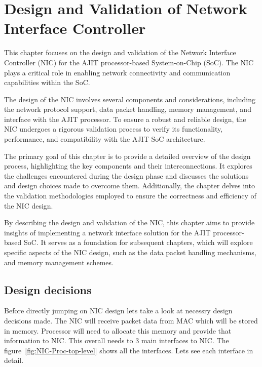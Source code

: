\documentclass[a4paper,11pt, final]{report}
\begin{document}
\chapter{Design and Validation of Network Interface Controller}

This chapter focuses on the design and validation of the Network Interface Controller (NIC) for the AJIT processor-based System-on-Chip (SoC). The NIC plays a critical role in enabling network connectivity and communication capabilities within the SoC.

The design of the NIC involves several components and considerations, including the network protocol support, data packet handling, memory management, and interface with the AJIT processor. To ensure a robust and reliable design, the NIC undergoes a rigorous validation process to verify its functionality, performance, and compatibility with the AJIT SoC architecture.

The primary goal of this chapter is to provide a detailed overview of the design process, highlighting the key components and their interconnections. It explores the challenges encountered during the design phase and discusses the solutions and design choices made to overcome them. Additionally, the chapter delves into the validation methodologies employed to ensure the correctness and efficiency of the NIC design.

By describing the design and validation of the NIC, this chapter aims to provide insights of implementing a network interface solution for the AJIT processor-based SoC. It serves as a foundation for subsequent chapters, which will explore specific aspects of the NIC design, such as the data packet handling mechanisms, and memory management schemes.

	
	\section{Design decisions}
		Before directly jumping on NIC design lets take a look at necessry design decisions made. The NIC will receive packet data from MAC
		which will be stored in memory. Processor will need to allocate this memory and provide that information to NIC. This overall needs to
		3 main interfaces to NIC. The figure~\ref{fig:NIC-Proc-top-level} shows all the interfaces. Lets see each interface in detail.	
\end{document}
